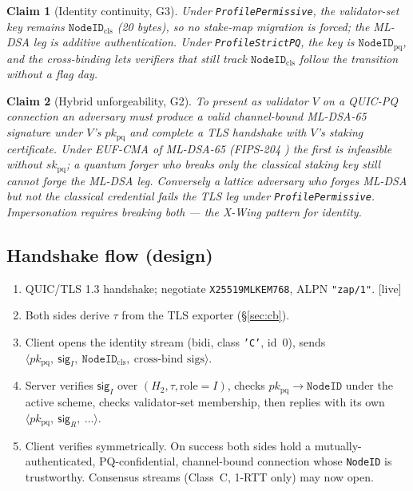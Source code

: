 \documentclass[11pt,a4paper]{article}
\newcommand{\code}[1]{\texttt{#1}}
\newtheorem{claim}{Claim}
\begin{document}
\begin{claim}[Identity continuity, G3]
Under \code{ProfilePermissive}, the validator-set key remains
$\code{NodeID}_{\mathrm{cls}}$ (20 bytes), so no stake-map migration is
forced; the ML-DSA leg is additive authentication. Under
\code{ProfileStrictPQ}, the key is $\code{NodeID}_{\mathrm{pq}}$, and the
cross-binding lets verifiers that still track $\code{NodeID}_{\mathrm{cls}}$
follow the transition without a flag day.
\end{claim}

\begin{claim}[Hybrid unforgeability, G2]
To present as validator $V$ on a QUIC-PQ connection an adversary must
produce a valid channel-bound ML-DSA-65 signature under $V$'s
$pk_{\mathrm{pq}}$ \emph{and} complete a TLS handshake with $V$'s staking
certificate. Under EUF-CMA of ML-DSA-65 (FIPS-204 \cite{fips204}) the
first is infeasible without $sk_{\mathrm{pq}}$; a quantum forger who
breaks only the classical staking key still cannot forge the ML-DSA
leg. Conversely a lattice adversary who forges ML-DSA but not the
classical credential fails the TLS leg under \code{ProfilePermissive}.
Impersonation requires breaking \emph{both} --- the X-Wing pattern for
identity.
\end{claim}

\subsection{Handshake flow (design)}\label{sec:flow}

\begin{enumerate}[nosep]
  \item QUIC/TLS 1.3 handshake; negotiate \code{X25519MLKEM768}, ALPN
        \code{"zap/1"}. [live]
  \item Both sides derive $\tau$ from the TLS exporter (\S\ref{sec:cb}).
  \item Client opens the identity stream (bidi, class \code{'C'},
        id~0), sends
        $\langle pk_{\mathrm{pq}},\ \mathsf{sig}_I,\ \code{NodeID}_{\mathrm{cls}},\ \text{cross-bind sigs}\rangle$.
  \item Server verifies $\mathsf{sig}_I$ over $(H_2,\tau,\text{role}=I)$,
        checks $pk_{\mathrm{pq}}\!\to\!\code{NodeID}$ under the active
        scheme, checks validator-set membership, then replies with its
        own $\langle pk_{\mathrm{pq}},\ \mathsf{sig}_R,\ \dots\rangle$.
  \item Client verifies symmetrically. On success both sides hold a
        mutually-authenticated, PQ-confidential, channel-bound
        connection whose \code{NodeID} is trustworthy. Consensus streams
        (Class~C, 1-RTT only) may now open.
\end{enumerate}
\end{document}
